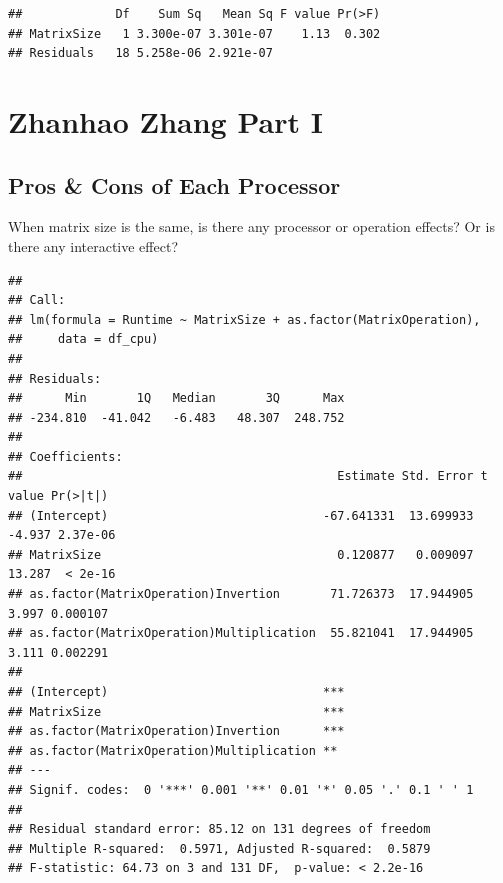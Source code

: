 \documentclass[
]{article}
\newenvironment{Shaded}{\begin{snugshade}}{\end{snugshade}}
\newcommand{\DataTypeTok}[1]{\textcolor[rgb]{0.13,0.29,0.53}{#1}}
\newcommand{\KeywordTok}[1]{\textcolor[rgb]{0.13,0.29,0.53}{\textbf{#1}}}
\newcommand{\NormalTok}[1]{#1}
\newcommand{\OperatorTok}[1]{\textcolor[rgb]{0.81,0.36,0.00}{\textbf{#1}}}
\newcommand{\StringTok}[1]{\textcolor[rgb]{0.31,0.60,0.02}{#1}}
\begin{document}
\begin{verbatim}
##             Df    Sum Sq   Mean Sq F value Pr(>F)
## MatrixSize   1 3.300e-07 3.301e-07    1.13  0.302
## Residuals   18 5.258e-06 2.921e-07
\end{verbatim}

\hypertarget{zhanhao-zhang-part-i}{%
\section{Zhanhao Zhang Part I}\label{zhanhao-zhang-part-i}}

\hypertarget{pros-cons-of-each-processor}{%
\subsection{Pros \& Cons of Each
Processor}\label{pros-cons-of-each-processor}}

When matrix size is the same, is there any processor or operation
effects? Or is there any interactive effect?

\begin{Shaded}
\end{Shaded}

\begin{verbatim}
## 
## Call:
## lm(formula = Runtime ~ MatrixSize + as.factor(MatrixOperation), 
##     data = df_cpu)
## 
## Residuals:
##      Min       1Q   Median       3Q      Max 
## -234.810  -41.042   -6.483   48.307  248.752 
## 
## Coefficients:
##                                            Estimate Std. Error t value Pr(>|t|)
## (Intercept)                              -67.641331  13.699933  -4.937 2.37e-06
## MatrixSize                                 0.120877   0.009097  13.287  < 2e-16
## as.factor(MatrixOperation)Invertion       71.726373  17.944905   3.997 0.000107
## as.factor(MatrixOperation)Multiplication  55.821041  17.944905   3.111 0.002291
##                                             
## (Intercept)                              ***
## MatrixSize                               ***
## as.factor(MatrixOperation)Invertion      ***
## as.factor(MatrixOperation)Multiplication ** 
## ---
## Signif. codes:  0 '***' 0.001 '**' 0.01 '*' 0.05 '.' 0.1 ' ' 1
## 
## Residual standard error: 85.12 on 131 degrees of freedom
## Multiple R-squared:  0.5971, Adjusted R-squared:  0.5879 
## F-statistic: 64.73 on 3 and 131 DF,  p-value: < 2.2e-16
\end{verbatim}
\end{document}

